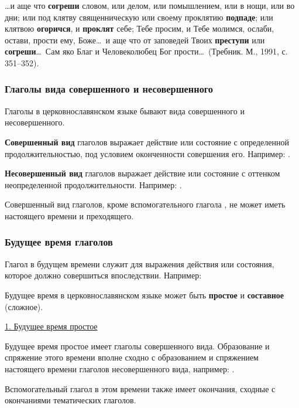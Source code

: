 \documentclass[11pt,a4paper,oneside]{memoir}
\begin{document}
    \ldots и аще что \textbf{согреши} словом, или делом, или помышлением, или в нощи, или во дни; или под клятву священническую или своему проклятию \textbf{подпаде}; или клятвою \textbf{огоричся}, и \textbf{проклят} себе; Тебе просим, и Тебе молимся, ослаби, остави, прости ему, Боже\ldots~и аще что от заповедей Твоих \textbf{преступи} или \textbf{согреши}\ldots~Сам яко Благ и Человеколюбец Бог прости\ldots~(Требник. М., 1991, с. 351--352).

                \subsubsection{Глаголы вида совершенного и несовершенного}

    Глаголы в церковнославянском языке бывают вида совершенного и несовершенного.
    
    \textbf{Совершенный вид} глаголов выражает действие или состояние с определенной продолжительностью, под условием оконченности совершения его. Например: {}.
    
    \textbf{Несовершенный вид} глаголов выражает действие или состояние с оттенком неопределенной продолжительности. Например: {}.
    
    Совершенный вид глаголов, кроме вспомогательного глагола {}, не может иметь настоящего времени и преходящего.

                \subsubsection{Будущее время глаголов}

    Глагол в будущем времени служит для выражения действия или состояния, которое должно совершиться впоследствии. Например:

    \bigskip{}

    Будущее время в церковнославянском языке может быть \textbf{простое} и \textbf{составное} (сложное).
    
    \underline{1. Будущее время простое}
    
    Будущее время простое имеет глаголы совершенного вида. Образование и спряжение этого времени вполне сходно с образованием и спряжением настоящего времени глаголов несовершенного вида, например: {}.
    
    Вспомогательный глагол {} в этом времени также имеет окончания, сходные с окончаниями тематических глаголов.
    
\end{document}
